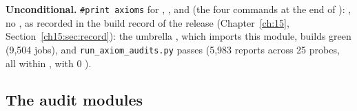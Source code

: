 \begin{status}
\textbf{Unconditional.}  \texttt{\#print axioms} for , ,
 and  (the four commands at the end of
): , no
, as recorded in the build record of the release (Chapter~\ref{ch:15}, Section~\ref{ch15:sec:record}): the umbrella
, which imports this module, builds green (9,504 jobs), and \texttt{run\_axiom\_audits.py} passes
(5,983 reports across 25 probes, all within , with 0 ).
\end{status}

\subsection{The audit modules}


